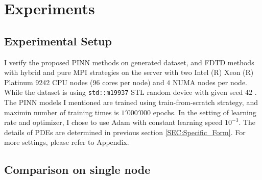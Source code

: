 \section{Experiments}
\subsection{Experimental Setup}
I verify the proposed PINN methods on generated dataset, and FDTD methods with hybrid and pure MPI strategies
on the server with two Intel (R) Xeon (R) Platinum 9242 CPU nodes (96 cores per node) and $4$ NUMA nodes per node.
While the dataset is using \texttt{std::m19937} STL random device with given seed $42$ \cite{STL:RANDOM_SEED}.
The PINN models I mentioned are trained using train-from-scratch strategy, and maximin number of training times is $1'000'000$ epochs.
In the setting of learning rate and optimizer, I chose to use Adam with constant learning speed $10^{-3}$.
The details of PDEs are determined in previous section \ref{SEC:Specific_Form}.  
For more settings, please refer to Appendix.

\subsection{Comparison on single node}




